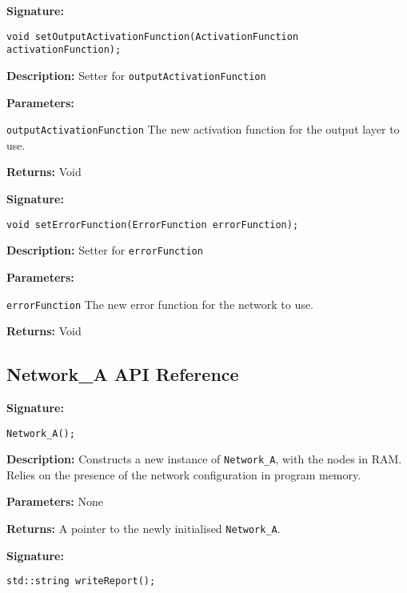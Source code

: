 \documentclass[a4paper]{article}
\begin{document}
\textbf{Signature:} \begin{lstlisting}
void setOutputActivationFunction(ActivationFunction activationFunction);
\end{lstlisting}

\textbf{Description: }
Setter for \lstinline{outputActivationFunction}

\textbf{Parameters: }

\lstinline{outputActivationFunction} The new activation function for the output layer to use.

\textbf{Returns: } Void

\hrulefill %

\textbf{Signature:} \begin{lstlisting}
void setErrorFunction(ErrorFunction errorFunction);
\end{lstlisting}

\textbf{Description: }
Setter for \lstinline{errorFunction}

\textbf{Parameters: }

\lstinline{errorFunction} The new error function for the network to use.

\textbf{Returns: } Void

\hrulefill %

\subsection{Network\_A API Reference}%
\label{subsec:dn_API_networka}

\hrulefill %

\textbf{Signature:} \begin{lstlisting}
Network_A();
\end{lstlisting}

\textbf{Description: }
Constructs a new instance of \lstinline{Network_A}, with the nodes in RAM. Relies on the presence of the network configuration in program memory.

\textbf{Parameters: } None

\textbf{Returns: }
A pointer to the newly initialised \lstinline{Network_A}.

\hrulefill %

\textbf{Signature:} \begin{lstlisting}
std::string writeReport();
\end{lstlisting}
\end{document}
